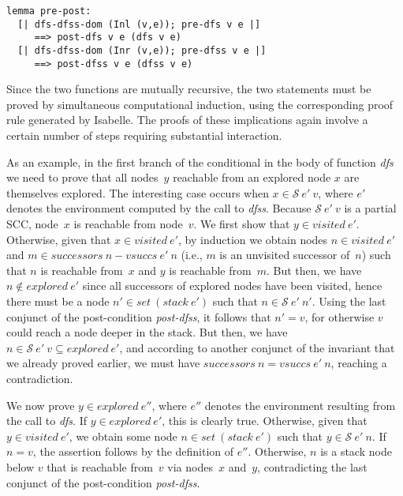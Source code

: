 \documentclass[sigplan,10pt,anonymous,review]{acmart}
\newcommand{\prog}[1]{\textit{#1}}
\renewcommand{\SS}{\mathcal{S}}
\begin{document}
\begin{small}
\begin{lstlisting}[language=isabelle]
lemma pre-post:
  [| dfs-dfss-dom (Inl (v,e)); pre-dfs v e |] 
     ==> post-dfs v e (dfs v e)
  [| dfs-dfss-dom (Inr (v,e)); pre-dfss v e |]
     ==> post-dfss v e (dfss v e)
\end{lstlisting}
\end{small}

Since the two functions are mutually recursive, the two statements must be proved by simultaneous computational induction, using the corresponding proof rule generated by Isabelle. The proofs of these implications again involve a certain number of steps requiring substantial interaction.

As an example, in the first branch of the conditional in the body of function \prog{dfs} we need to prove that all nodes~$y$ reachable from an explored node $x$ are themselves explored. The interesting case occurs when $x \in \SS~e'~v$, where $e'$ denotes the environment computed by the call to \prog{dfss}. Because $\SS~e'~v$ is a partial SCC, node~$x$ is reachable from node~$v$. We first show that $y \in \prog{visited}~e'$. Otherwise, given that $x \in \prog{visited}~e'$, by induction we obtain nodes $n \in \prog{visited}~e'$ and $m \in \prog{successors}~n - \prog{vsuccs}~e'~n$ (i.e., $m$ is an unvisited successor of~$n$) such that $n$ is reachable from~$x$ and $y$ is reachable from~$m$. But then, we have $n \notin \prog{explored}~e'$ since all successors of explored nodes have been visited, hence there must be a node $n' \in \prog{set}~(\prog{stack}~e')$ such that $n \in \SS~e'~n'$. Using the last conjunct of the post-condition \prog{post-dfss}, it follows that $n' = v$, for otherwise $v$ could reach a node deeper in the stack. But then, we have $n \in \SS~e'~v \subseteq \prog{explored}~e'$, and according to another conjunct of the invariant that we already proved earlier, we must have $\prog{successors}~n = \prog{vsuccs}~e'~n$, reaching a contradiction.

We now prove $y \in \prog{explored}~e''$, where $e''$ denotes the environment resulting from the call to \prog{dfs}. If $y \in \prog{explored}~e'$, this is clearly true. Otherwise, given that $y \in \prog{visited}~e'$, we obtain some node $n \in \prog{set}~(\prog{stack}~e')$ such that $y \in \SS~e'~n$. If $n=v$, the assertion follows by the definition of $e''$. Otherwise, $n$ is a stack node below $v$ that is reachable from~$v$ via nodes~$x$ and~$y$, contradicting the last conjunct of the post-condition \prog{post-dfss}.
\end{document}
